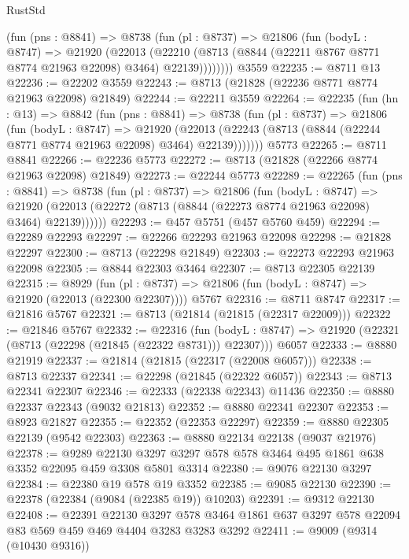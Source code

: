 \begin{lexlean}{RustStd}
\begin{coremodule}
        (fun (pns : @8841) =>
        @8738
          (fun (pl : @8737) =>
          @21806
            (fun (bodyL : @8747) =>
            @21920
              (@22013
                (@22210 (@8713 (@8844 (@22211 @8767 @8771 @8774 @21963 @22098) @3464) @22139))))))))
    @3559
@22235 := @8711 @13
@22236 := @22202 @3559
@22243 := @8713 (@21828 (@22236 @8771 @8774 @21963 @22098) @21849)
@22244 := @22211 @3559
@22264 := @22235
    (fun (hn : @13) =>
    @8842
      (fun (pns : @8841) =>
      @8738
        (fun (pl : @8737) =>
        @21806
          (fun (bodyL : @8747) =>
          @21920
            (@22013 (@22243 (@8713 (@8844 (@22244 @8771 @8774 @21963 @22098) @3464) @22139)))))))
    @5773
@22265 := @8711 @8841
@22266 := @22236 @5773
@22272 := @8713 (@21828 (@22266 @8774 @21963 @22098) @21849)
@22273 := @22244 @5773
@22289 := @22265
    (fun (pns : @8841) =>
    @8738
      (fun (pl : @8737) =>
      @21806
        (fun (bodyL : @8747) =>
        @21920 (@22013 (@22272 (@8713 (@8844 (@22273 @8774 @21963 @22098) @3464) @22139))))))
@22293 := @457 @5751 (@457 @5760 @459)
@22294 := @22289 @22293
@22297 := @22266 @22293 @21963 @22098
@22298 := @21828 @22297
@22300 := @8713 (@22298 @21849)
@22303 := @22273 @22293 @21963 @22098
@22305 := @8844 @22303 @3464
@22307 := @8713 @22305 @22139
@22315 := @8929
    (fun (pl : @8737) => @21806 (fun (bodyL : @8747) => @21920 (@22013 (@22300 @22307))))
    @5767
@22316 := @8711 @8747
@22317 := @21816 @5767
@22321 := @8713 (@21814 (@21815 (@22317 @22009)))
@22322 := @21846 @5767
@22332 := @22316
    (fun (bodyL : @8747) => @21920 (@22321 (@8713 (@22298 (@21845 (@22322 @8731))) @22307)))
    @6057
@22333 := @8880 @21919
@22337 := @21814 (@21815 (@22317 (@22008 @6057)))
@22338 := @8713 @22337
@22341 := @22298 (@21845 (@22322 @6057))
@22343 := @8713 @22341 @22307
@22346 := @22333 (@22338 @22343) @11436
@22350 := @8880 @22337 @22343 (@9032 @21813)
@22352 := @8880 @22341 @22307
@22353 := @8923 @21827
@22355 := @22352 (@22353 @22297)
@22359 := @8880 @22305 @22139 (@9542 @22303)
@22363 := @8880 @22134 @22138 (@9037 @21976)
@22378 := @9289
    @22130
    @3297
    @3297
    @578
    @578
    @3464
    @495
    @1861
    @638
    @3352
    @22095
    @459
    @3308
    @5801
    @3314
@22380 := @9076 @22130 @3297
@22384 := @22380 @19 @578 @19 @3352
@22385 := @9085 @22130
@22390 := @22378 (@22384 (@9084 (@22385 @19)) @10203)
@22391 := @9312 @22130
@22408 := @22391
    @22130
    @3297
    @578
    @3464
    @1861
    @637
    @3297
    @578
    @22094
    @83
    @569
    @459
    @469
    @4404
    @3283
    @3283
    @3292
@22411 := @9009 (@9314 (@10430 @9316))

\end{coremodule}
\end{lexlean}
